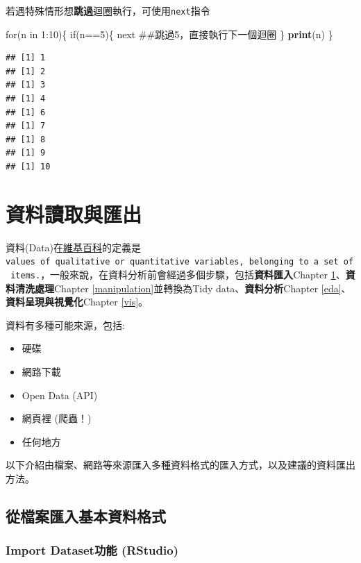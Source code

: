 \documentclass[]{book}
\newenvironment{Shaded}{\begin{snugshade}}{\end{snugshade}}
\newcommand{\KeywordTok}[1]{\textcolor[rgb]{0.13,0.29,0.53}{\textbf{{#1}}}}
\newcommand{\DecValTok}[1]{\textcolor[rgb]{0.00,0.00,0.81}{{#1}}}
\newcommand{\NormalTok}[1]{{#1}}
\providecommand{\tightlist}{%
  \setlength{\itemsep}{0pt}\setlength{\parskip}{0pt}}
\theoremstyle{definition}
\theoremstyle{definition}
\theoremstyle{remark}
\begin{document}
若遇特殊情形想\textbf{跳過}迴圈執行，可使用\texttt{next}指令

\begin{Shaded}
\begin{Highlighting}[]
\NormalTok{for(n in }\DecValTok{1}\NormalTok{:}\DecValTok{10}\NormalTok{)\{}
  \NormalTok{if(n==}\DecValTok{5}\NormalTok{)\{}
    \NormalTok{next ##跳過5，直接執行下一個迴圈}
  \NormalTok{\}}
  \KeywordTok{print}\NormalTok{(n)}
\NormalTok{\}}
\end{Highlighting}
\end{Shaded}

\begin{verbatim}
## [1] 1
## [1] 2
## [1] 3
## [1] 4
## [1] 6
## [1] 7
## [1] 8
## [1] 9
## [1] 10
\end{verbatim}

\chapter{資料讀取與匯出}\label{io}

資料(Data)在\href{http://en.wikipedia.org/wiki/Data}{維基百科}的定義是\texttt{values\ of\ qualitative\ or\ quantitative\ variables,\ belonging\ to\ a\ set\ of\ items.}，一般來說，在資料分析前會經過多個步驟，包括\textbf{資料匯入}Chapter
\ref{io}、\textbf{資料清洗處理}Chapter \ref{manipulation}並轉換為Tidy
data、\textbf{資料分析}Chapter
\ref{eda}、\textbf{資料呈現與視覺化}Chapter \ref{vis}。

資料有多種可能來源，包括:

\begin{itemize}
\tightlist
\item
  硬碟
\item
  網路下載
\item
  Open Data (API)
\item
  網頁裡 (爬蟲！)
\item
  任何地方
\end{itemize}

以下介紹由檔案、網路等來源匯入多種資料格式的匯入方式，以及建議的資料匯出方法。

\section{從檔案匯入基本資料格式}\label{file}

\subsection{Import Dataset功能 (RStudio)}\label{import-dataset-rstudio}
\end{document}

